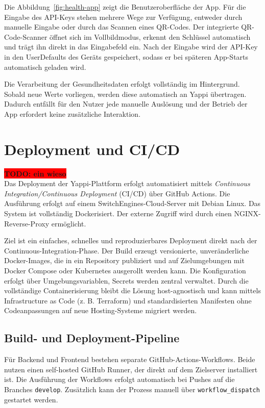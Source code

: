 \documentclass[12pt,a4paper]{report}
\newcommand{\todo}[1]{\colorbox{red}{\textbf{TODO: #1}}\\}
\begin{document}
Die Abbildung~\ref{fig:health-app} zeigt die Benutzeroberfläche der App. Für die Eingabe des API-Keys stehen mehrere Wege zur
Verfügung, entweder durch manuelle Eingabe oder durch das Scannen eines QR-Codes. Der integrierte QR-Code-Scanner öffnet sich im
Vollbildmodus, erkennt den Schlüssel automatisch und trägt ihn direkt in das Eingabefeld ein. Nach der Eingabe wird der API-Key
in den UserDefaults des Geräts gespeichert, sodass er bei späteren App-Starts automatisch geladen wird.

Die Verarbeitung der Gesundheitsdaten erfolgt vollständig im Hintergrund. Sobald neue Werte vorliegen, werden diese automatisch an
Yappi übertragen. Dadurch entfällt für den Nutzer jede manuelle Auslösung und der Betrieb der App erfordert keine zusätzliche
Interaktion.


\section{Deployment und CI/CD}
\todo{ein wieso}

    Das Deployment der Yappi-Plattform erfolgt automatisiert mittels \textit{Continuous Integration/Continuous Deployment}
    (CI/CD) über GitHub Actions. Die Ausführung erfolgt auf einem SwitchEngines-Cloud-Server mit Debian Linux.
    Das System ist vollständig Dockerisiert. Der externe Zugriff wird durch einen NGINX-Reverse-Proxy ermöglicht.

    Ziel ist ein einfaches, schnelles und reproduzierbares Deployment direkt nach der Continuous-Integration-Phase.
    Der Build erzeugt versionierte, unveränderliche Docker-Images, die in ein Repository publiziert und auf
    Zielumgebungen mit Docker Compose oder Kubernetes ausgerollt werden kann. Die Konfiguration erfolgt über
    Umgebungsvariablen, Secrets werden zentral verwaltet. Durch die vollständige Containerisierung bleibt die Lösung
    host-agnostisch und kann mittels Infrastructure as Code (z. B. Terraform) und standardisierten Manifesten
    ohne Codeanpassungen auf neue Hosting-Systeme migriert werden.

    \subsection{Build- und Deployment-Pipeline}

        Für Backend und Frontend bestehen separate GitHub-Actions-Workflows.
        Beide nutzen einen self-hosted GitHub Runner, der direkt auf dem Zielserver installiert ist.
        Die Ausführung der Workflows erfolgt automatisch bei Pushes auf die Branches \texttt{develop}.
        Zusätzlich kann der Prozess manuell über \texttt{workflow\_dispatch} gestartet werden.
\end{document}
